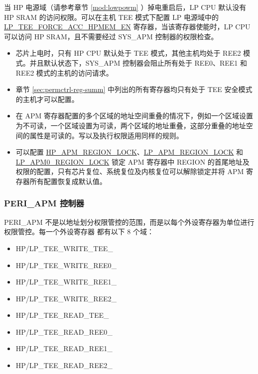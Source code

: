 \documentclass[main\_\_CN.tex]{subfiles}
\begin{document}
当 HP 电源域（请参考章节 \ref{mod:lowpowm} \textit{}）掉电重启后，LP CPU 默认没有 HP SRAM 的访问权限。可以在主机 TEE 模式下配置 LP 电源域中的 \hyperref[fielddesc:LPTEEFORCEACCHPMEMEN]{LP\_TEE\_FORCE\_ACC\_HPMEM\_EN} 寄存器，当该寄存器使能时，LP CPU 可以访问 HP SRAM，且不需要经过 SYS\_APM 控制器的权限检查。




\begin{tiplisting}
\vspace{-2em}
\begin{itemize}
    \item 芯片上电时，只有 HP CPU 默认处于 TEE 模式，其他主机均处于 REE2 模式。并且默认状态下，SYS\_APM 控制器会阻止所有处于 REE0、REE1 和 REE2 模式的主机的访问请求。
    \item 章节 \ref{sec:permctrl-reg-summ}  中列出的所有寄存器均只有处于 TEE 安全模式的主机才可以配置。
    \item 在 APM 寄存器配置的多个区域的地址空间重叠的情况下，例如一个区域设置为不可读，一个区域设置为可读，两个区域的地址重叠，这部分重叠的地址空间的属性是可读的。写以及执行权限适用同样的规则。
    \item 可以配置 \hyperref[fielddesc:HPAPMREGIONNLOCK]{HP\_APM\_REGION\_LOCK}、\hyperref[fielddesc:LPAPMREGIONNLOCK]{LP\_APM\_REGION\_LOCK} 和 \hyperref[fielddesc:LPAPM0REGIONNLOCK]{LP\_APM0\_REGION\_LOCK} 锁定 APM 寄存器中 REGION 的首尾地址及权限的配置，只有芯片复位、系统复位及内核复位可以解除锁定并将 APM 寄存器所有配置恢复成默认值。
\end{itemize}
\end{tiplisting}

\subsubsection{PERI\_APM 控制器}

PERI\_APM 不是以地址划分权限管控的范围，而是以每个外设寄存器为单位进行权限管控。每一个外设寄存器  都有以下 8 个域：

\begin{itemize}
    \item HP/LP\_TEE\_WRITE\_TEE\_
    \item HP/LP\_TEE\_WRITE\_REE0\_
    \item HP/LP\_TEE\_WRITE\_REE1\_
    \item HP/LP\_TEE\_WRITE\_REE2\_
    \item HP/LP\_TEE\_READ\_TEE\_
    \item HP/LP\_TEE\_READ\_REE0\_
    \item HP/LP\_TEE\_READ\_REE1\_
    \item HP/LP\_TEE\_READ\_REE2\_
\end{itemize}
\end{document}
